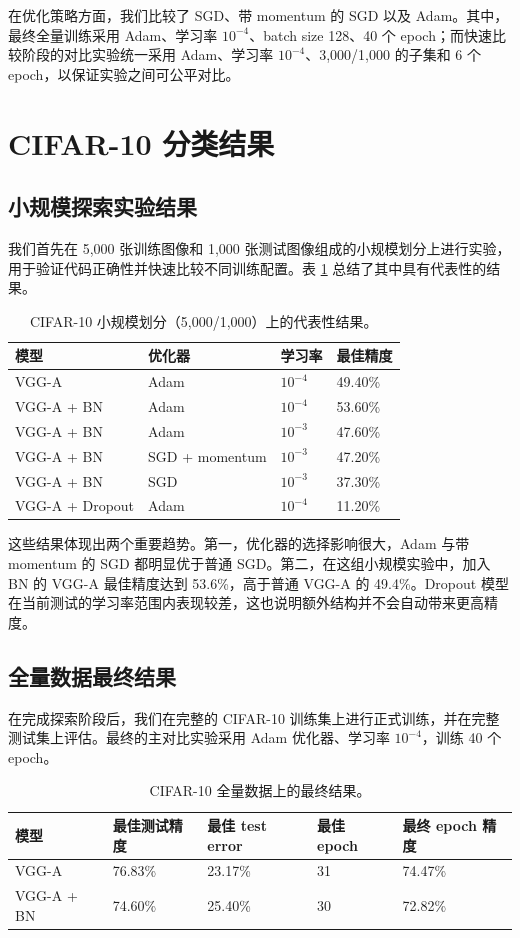 \documentclass[11pt]{article}
\begin{document}
在优化策略方面，我们比较了 SGD、带 momentum 的 SGD 以及 Adam。其中，最终全量训练采用 Adam、学习率 $10^{-4}$、batch size 128、40 个 epoch；而快速比较阶段的对比实验统一采用 Adam、学习率 $10^{-4}$、3,000/1,000 的子集和 6 个 epoch，以保证实验之间可公平对比。

\section{CIFAR-10 分类结果}
\subsection{小规模探索实验结果}
我们首先在 5,000 张训练图像和 1,000 张测试图像组成的小规模划分上进行实验，用于验证代码正确性并快速比较不同训练配置。表 \ref{tab:subset-results} 总结了其中具有代表性的结果。

\begin{table}[H]
\centering
\caption{CIFAR-10 小规模划分（5,000/1,000）上的代表性结果。}
\label{tab:subset-results}
\begin{tabular}{llll}
\toprule
模型 & 优化器 & 学习率 & 最佳精度 \\
\midrule
VGG-A & Adam & $10^{-4}$ & 49.40\% \\
VGG-A + BN & Adam & $10^{-4}$ & 53.60\% \\
VGG-A + BN & Adam & $10^{-3}$ & 47.60\% \\
VGG-A + BN & SGD + momentum & $10^{-3}$ & 47.20\% \\
VGG-A + BN & SGD & $10^{-3}$ & 37.30\% \\
VGG-A + Dropout & Adam & $10^{-4}$ & 11.20\% \\
\bottomrule
\end{tabular}
\end{table}

这些结果体现出两个重要趋势。第一，优化器的选择影响很大，Adam 与带 momentum 的 SGD 都明显优于普通 SGD。第二，在这组小规模实验中，加入 BN 的 VGG-A 最佳精度达到 53.6\%，高于普通 VGG-A 的 49.4\%。Dropout 模型在当前测试的学习率范围内表现较差，这也说明额外结构并不会自动带来更高精度。

\subsection{全量数据最终结果}
在完成探索阶段后，我们在完整的 CIFAR-10 训练集上进行正式训练，并在完整测试集上评估。最终的主对比实验采用 Adam 优化器、学习率 $10^{-4}$，训练 40 个 epoch。

\begin{table}[H]
\centering
\caption{CIFAR-10 全量数据上的最终结果。}
\label{tab:full-results}
\begin{tabular}{lllll}
\toprule
模型 & 最佳测试精度 & 最佳 test error & 最佳 epoch & 最终 epoch 精度 \\
\midrule
VGG-A & 76.83\% & 23.17\% & 31 & 74.47\% \\
VGG-A + BN & 74.60\% & 25.40\% & 30 & 72.82\% \\
\bottomrule
\end{tabular}
\end{table}
\end{document}

